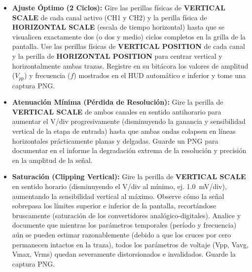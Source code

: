 \documentclass[12pt, letterpaper]{article}
\begin{document}
\begin{itemize}
    \item \textbf{Ajuste Óptimo (2 Ciclos):} Gire las perillas físicas de \textbf{VERTICAL SCALE} de cada canal activo (CH1 y CH2) y la perilla física de \textbf{HORIZONTAL SCALE} (escala de tiempo horizontal) hasta que se visualicen exactamente dos (o dos y medio) ciclos completos en la grilla de la pantalla. Use las perillas físicas de \textbf{VERTICAL POSITION} de cada canal y la perilla de \textbf{HORIZONTAL POSITION} para centrar vertical y horizontalmente ambas trazas. Registre en su bitácora los valores de amplitud ($V_{pp}$) y frecuencia ($f$) mostrados en el HUD automático e inferior y tome una captura PNG.
    
    \item \textbf{Atenuación Mínima (Pérdida de Resolución):} Gire la perilla de \textbf{VERTICAL SCALE} de ambos canales en sentido antihorario para aumentar el V/div progresivamente (disminuyendo la ganancia y sensibilidad vertical de la etapa de entrada) hasta que ambas ondas colapsen en líneas horizontales prácticamente planas y delgadas. Guarde un PNG para documentar en el informe la degradación extrema de la resolución y precisión en la amplitud de la señal.
    
    \item \textbf{Saturación (Clipping Vertical):} Gire la perilla de \textbf{VERTICAL SCALE} en sentido horario (disminuyendo el V/div al mínimo, ej. \SI{1.0}{mV/div}), aumentando la sensibilidad vertical al máximo. Observe cómo la señal sobrepasa los límites superior e inferior de la pantalla, recortándose bruscamente (saturación de los convertidores analógico-digitales). 
    Analice y documente que mientras los parámetros temporales (período y frecuencia) aún se pueden estimar razonablemente (debido a que los cruces por cero permanecen intactos en la traza), todos los parámetros de voltaje (Vpp, Vavg, Vmax, Vrms) quedan severamente distorsionados e invalidados. Guarde la captura PNG.
    

\end{itemize}
\end{document}
